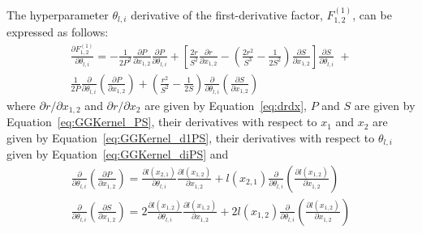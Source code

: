 \documentclass{article}
\begin{document}
The hyperparameter $\theta_{l,i}$ derivative of the first-derivative factor, $F^{\left(1\right)}_{1,2}$, can be expressed as follows:
\begin{multline}
\label{eq:GGKernel_diF1}
	\frac{\partial F^{\left(1\right)}_{1,2}}{\partial \theta_{l,i}} = -\frac{1}{2P^2} \frac{\partial P}{\partial x_{1,2}} \frac{\partial P}{\partial \theta_{l,i}} + \left[\frac{2r}{S^2} \frac{\partial r}{\partial x_{1,2}} - \left(\frac{2r^2}{S^3} - \frac{1}{2S^2}\right) \frac{\partial S}{\partial x_{1,2}}\right] \frac{\partial S}{\partial \theta_{l,i}} \; +\\
	\frac{1}{2P} \frac{\partial}{\partial \theta_{l,i}}\!\left(\frac{\partial P}{\partial x_{1,2}}\right) + \left(\frac{r^2}{S^2} - \frac{1}{2S}\right) \frac{\partial}{\partial \theta_{l,i}}\!\left(\frac{\partial S}{\partial x_{1,2}}\right)
\end{multline}
where $\partial r/\partial x_{1,2}$ and $\partial r/\partial x_2$ are given by Equation~\eqref{eq:drdx}, $P$ and $S$ are given by Equation~\eqref{eq:GGKernel_PS}, their derivatives with respect to $x_1$ and $x_2$ are given by Equation~\eqref{eq:GGKernel_d1PS}, their derivatives with respect to $\theta_{l,i}$ given by Equation~\eqref{eq:GGKernel_diPS} and
\begin{equation}
\label{eq:GGKernel_did1PS}
	\begin{gathered}
	\frac{\partial}{\partial \theta_{l,i}}\!\left(\frac{\partial P}{\partial x_{1,2}}\right) = \frac{\partial l\!\left(x_{2,1}\right)}{\partial \theta_{l,i}} \frac{\partial l\!\left(x_{1,2}\right)}{\partial x_{1,2}} + l\!\left(x_{2,1}\right) \frac{\partial}{\partial \theta_{l,i}} \left(\frac{\partial l\!\left(x_{1,2}\right)}{\partial x_{1,2}}\right) \\
	\frac{\partial}{\partial \theta_{l,i}}\!\left(\frac{\partial S}{\partial x_{1,2}}\right) = 2 \frac{\partial l\!\left(x_{1,2}\right)}{\partial \theta_{l,i}} \frac{\partial l\!\left(x_{1,2}\right)}{\partial x_{1,2}} + 2 l\!\left(x_{1,2}\right) \frac{\partial}{\partial \theta_{l,i}} \left(\frac{\partial l\!\left(x_{1,2}\right)}{\partial x_{1,2}}\right)
	\end{gathered}
\end{equation}
\end{document}
